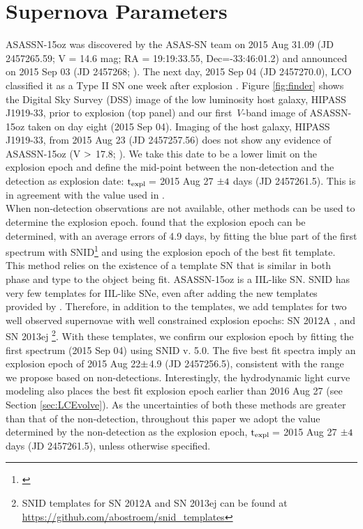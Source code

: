 \documentclass[a4paper,fleqn,usenatbib]{mnras}
\begin{document}
\section{Supernova Parameters} \label{15ozIntro}
ASASSN-15oz was discovered by the ASAS-SN team on 2015 Aug 31.09 (JD 2457265.59; V = 14.6 mag; RA = 19:19:33.55, Dec=-33:46:01.2) and announced on 2015 Sep 03 (JD 2457268; \citealt{2015brown}). 
The next day, 2015 Sep 04 (JD 2457270.0), LCO classified it as a Type II SN one week after explosion \citep{2015hosseinzadeh}. 
Figure \ref{fig:finder} shows the Digital Sky Survey (DSS) image of the low luminosity host galaxy, HIPASS J1919-33, prior to explosion (top panel) and our first {\it V}-band image of ASASSN-15oz taken on day eight (2015 Sep 04).
Imaging of the host galaxy, HIPASS J1919-33, from 2015 Aug 23 (JD 2457257.56) does not show any evidence of ASASSN-15oz (V $\rm{>}$ 17.8; \citealt{2015brown}). 
We take this date to be a lower limit on the explosion epoch and define the mid-point between the non-detection and the detection as explosion date: $\rm{t_{expl} =}$ 2015 Aug 27 $\rm{\pm 4}$ days (JD 2457261.5). 
This is in agreement with the value used in \citet{2018gutierrez}.\\
\indent When non-detection observations are not available, other methods can be used to determine the explosion epoch. 
\citet{2017gutierrez} found that the explosion epoch can be determined, with an average errors of 4.9 days, by fitting the blue part of the first spectrum with SNID\footnote{\citet{2011blondin}} 
\citep{2007blondin} and using the explosion epoch of the best fit template.
This method relies on the existence of a template SN that is similar in both phase and type to the object being fit.
ASASSN-15oz is a IIL-like SN. 
SNID has very few templates for IIL-like SNe, even after adding the new templates provided by \citet{2017gutierrez}. 
Therefore, in addition to the \citet{2017gutierrez} templates, we add templates for two well observed supernovae with well constrained explosion epochs: SN 2012A \citep{2013tomasella}, and SN 2013ej \citep{2016childress,2016dhungana,2014valenti,2015smartt} \footnote{SNID templates for SN 2012A and SN 2013ej can be found at \hyperlink{https://github.com/abostroem/snid\_templates}{https://github.com/abostroem/snid\_templates}}.
With these templates, we confirm our explosion epoch by fitting the first spectrum (2015 Sep 04) using SNID v. 5.0.
The five best fit spectra imply an explosion epoch of  2015 Aug 22$\rm{\pm}$4.9 (JD 2457256.5), consistent with the range we propose based on non-detections.
Interestingly, the hydrodynamic light curve modeling also places the best fit explosion epoch earlier than 2016 Aug 27 (see Section \ref{sec:LCEvolve}).
As the uncertainties of both these methods are greater than that of the non-detection, throughout this paper we adopt the value determined by the non-detection as the explosion epoch, $\rm{t_{expl} =}$ 2015 Aug 27 $\rm{\pm 4}$ days (JD 2457261.5), unless otherwise specified.
\end{document}
